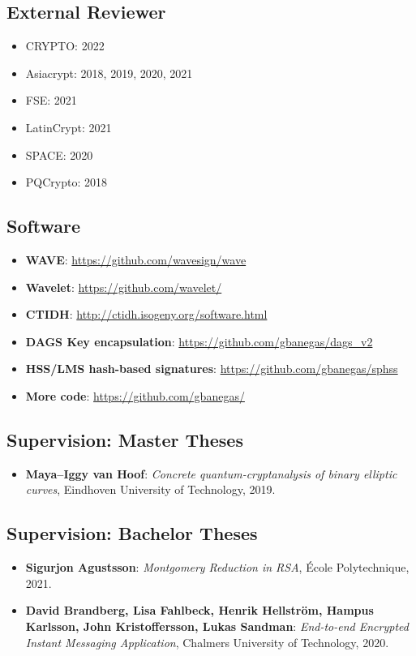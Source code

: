 \documentclass[11pt, a4paper]{article}
\begin{document}
\subsection*{External Reviewer}
\begin{itemize}
    \item CRYPTO: 2022
    \item Asiacrypt: 2018, 2019, 2020, 2021
    \item FSE: 2021
    \item LatinCrypt: 2021
    \item SPACE: 2020
    \item PQCrypto: 2018
\end{itemize}

\subsection*{Software}
\begin{itemize}
    \item \textbf{WAVE}: \url{https://github.com/wavesign/wave}
    \item \textbf{Wavelet}: \url{https://github.com/wavelet/}
    \item \textbf{CTIDH}: \url{http://ctidh.isogeny.org/software.html}
    \item \textbf{DAGS Key encapsulation}: \url{https://github.com/gbanegas/dags_v2}
    \item \textbf{HSS/LMS hash-based signatures}: \url{https://github.com/gbanegas/sphss}
    \item \textbf{More code}: \url{https://github.com/gbanegas/}
\end{itemize}

\subsection*{Supervision: Master Theses}
\begin{itemize}
    \item \textbf{Maya--Iggy van Hoof}:  
    \textit{Concrete quantum-cryptanalysis of binary elliptic curves}, Eindhoven University of Technology, 2019.
\end{itemize}

\subsection*{Supervision: Bachelor Theses}
\begin{itemize}
    \item \textbf{Sigurjon Agustsson}:  
    \textit{Montgomery Reduction in RSA}, École Polytechnique, 2021.
    
    \item \textbf{David Brandberg, Lisa Fahlbeck, Henrik Hellström, Hampus Karlsson, John Kristoffersson, Lukas Sandman}:  
    \textit{End-to-end Encrypted Instant Messaging Application}, Chalmers University of Technology, 2020.
\end{itemize}

\nocite{*}
 
   
\end{document}
